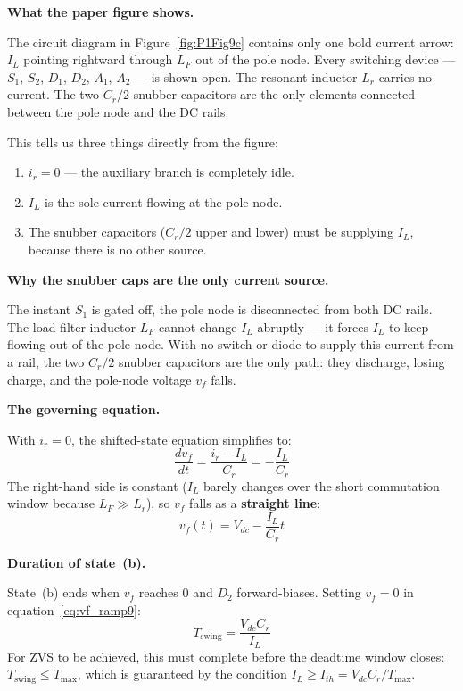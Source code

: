 \documentclass[12pt, a4paper]{article}
\def\,{ }%
\newcommand{\Vdc}{V_{dc}}
\newcommand{\vf}{v_f}
\newcommand{\ir}{i_r}
\newcommand{\IL}{I_L}
\newcommand{\Lr}{L_r}
\newcommand{\Ith}{I_{th}}
\newcommand{\figref}[1]{Figure~\ref{#1}}
\begin{document}
\textbf{What the paper figure shows.}

The circuit diagram in \figref{fig:P1Fig9c} contains only one bold
current arrow: $\IL$ pointing rightward through $L_F$ out of the pole
node.
Every switching device --- $S_1$, $S_2$, $D_1$, $D_2$, $A_1$, $A_2$
--- is shown open.
The resonant inductor $\Lr$ carries no current.
The two $C_r/2$ snubber capacitors are the only elements connected
between the pole node and the DC rails.

This tells us three things directly from the figure:
\begin{enumerate}
    \item $\ir = 0$ --- the auxiliary branch is completely idle.
    \item $\IL$ is the sole current flowing at the pole node.
    \item The snubber capacitors ($C_r/2$ upper and lower) must be
          supplying $\IL$, because there is no other source.
\end{enumerate}

\medskip
\textbf{Why the snubber caps are the only current source.}

The instant $S_1$ is gated off, the pole node is disconnected from
both DC rails.
The load filter inductor $L_F$ cannot change $\IL$ abruptly --- it
forces $\IL$ to keep flowing out of the pole node.
With no switch or diode to supply this current from a rail, the two
$C_r/2$ snubber capacitors are the only path: they discharge, losing
charge, and the pole-node voltage $\vf$ falls.

\medskip
\textbf{The governing equation.}

With $\ir = 0$, the shifted-state equation simplifies to:
\begin{equation}
    \frac{d\vf}{dt} = \frac{\ir - \IL}{C_r} = -\frac{\IL}{C_r}
    \label{eq:natural_discharge_b9}
\end{equation}
The right-hand side is constant ($\IL$ barely changes over the short
commutation window because $L_F \gg \Lr$), so $\vf$ falls as a
\textbf{straight line}:
\begin{equation}
    \vf(t) = \Vdc - \frac{\IL}{C_r}\,t
    \label{eq:vf_ramp9}
\end{equation}

\medskip
\textbf{Duration of state~(b).}

State~(b) ends when $\vf$ reaches $0$ and $D_2$ forward-biases.
Setting $\vf = 0$ in equation~\eqref{eq:vf_ramp9}:
\begin{equation}
    T_\text{swing} = \frac{\Vdc\,C_r}{\IL}
    \label{eq:Tswing_b9}
\end{equation}
For ZVS to be achieved, this must complete before the deadtime window
closes: $T_\text{swing} \leq T_\text{max}$, which is guaranteed by the
condition $\IL \geq \Ith = \Vdc\,C_r/T_\text{max}$.
\end{document}
